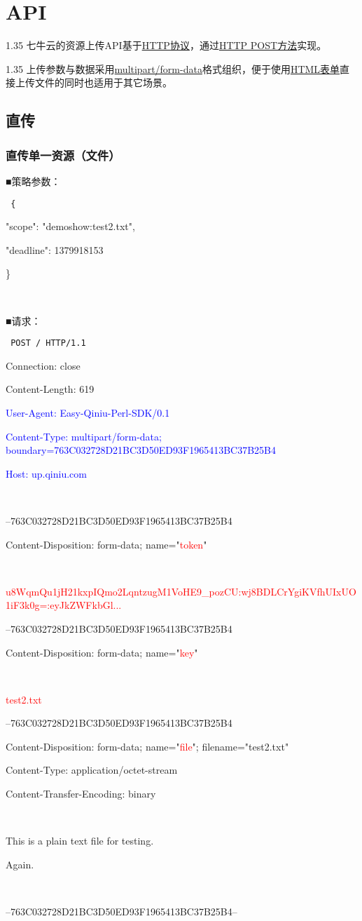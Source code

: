 \documentclass[11pt, oneside]{book}
\newcommand{\qpara}[1]{
\vspace{0.2em}
\begin{spacing}{1.35}
\noindent
#1\par
\end{spacing}
\vspace{0.2em}
}
\newcommand{\qblock}[1]{
\vspace{0.1em}
\noindent
#1\par
\vspace{0.1em}
}
\newcommand{\qhttp}[1]{\noindent #1\par}
\begin{document}
\chapter{API}

\qpara{七牛云的资源上传API基于\href{http://en.wikipedia.org/wiki/Hypertext\_Transfer\_Protocol}{HTTP协议}，通过\href{http://en.wikipedia.org/wiki/POST\_(HTTP)}{HTTP POST方法}实现。}
\qpara{上传参数与数据采用\href{http://en.wikipedia.org/wiki/MIME\#Multipart\_messages}{multipart/form-data}格式组织，便于使用\href{http://www.w3.org/TR/html4/interact/forms.html}{HTML表单}直接上传文件的同时也适用于其它场景。}

\section{直传}

\subsection{直传单一资源（文件）}

\qblock{■\thinspace 策略参数：}
{
\tt \footnotesize
\qhttp{\{}
\qhttp{    "scope":    "demoshow:test2.txt",}
\qhttp{    "deadline": 1379918153}
\qhttp{\}}
\qhttp{\ }
}

\qblock{■\thinspace 请求：}
{
\tt \footnotesize
\qhttp{POST / HTTP/1.1}
\qhttp{Connection: close}
\qhttp{Content-Length: 619}
\qhttp{\textcolor{blue}{User-Agent: Easy-Qiniu-Perl-SDK/0.1}}
\qhttp{\textcolor{blue}{Content-Type: multipart/form-data; boundary=763C032728D21BC3D50ED93F1965413BC37B25B4}}
\qhttp{\textcolor{blue}{Host: up.qiniu.com}}
\qhttp{\ }
\qhttp{--763C032728D21BC3D50ED93F1965413BC37B25B4}
\qhttp{Content-Disposition: form-data; name="\textcolor{red}{token}"}
\qhttp{\ }
\qhttp{\textcolor{red}{u8WqmQu1jH21kxpIQmo2LqntzugM1VoHE9\_pozCU:wj8BDLCrYgiKVfhUIxUO1iF3k0g=:eyJkZWFkbGl...}}
\qhttp{--763C032728D21BC3D50ED93F1965413BC37B25B4}
\qhttp{Content-Disposition: form-data; name="\textcolor{red}{key}"}
\qhttp{\ }
\qhttp{\textcolor{red}{test2.txt}}
\qhttp{--763C032728D21BC3D50ED93F1965413BC37B25B4}
\qhttp{Content-Disposition: form-data; name="\textcolor{red}{file}"; filename="test2.txt"}
\qhttp{Content-Type: application/octet-stream}
\qhttp{Content-Transfer-Encoding: binary}
\qhttp{\ }
\qhttp{\textcolor{YellowOrange}{This is a plain text file for testing.}}
\qhttp{\textcolor{YellowOrange}{Again.}}
\qhttp{\ }
\qhttp{--763C032728D21BC3D50ED93F1965413BC37B25B4--}
\qhttp{\ }
}
\end{document}
